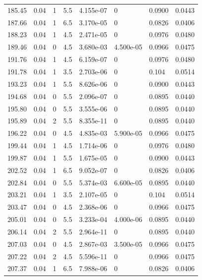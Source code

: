 \documentclass[preview]{standalone}
\begin{document}
{{{{{\begin{tabular}{L{1.2cm}C{1.2cm} C{0.3cm}C{0.5cm} C{1.4cm}C{1.4cm} C{1.4cm}C{1.4cm}}
  185.45  &  0.04  & 1     & 5.5 &  4.155e-07  & 0  & 0.0900 &  0.0443   \\ 
  187.66  &  0.04  & 1     & 6.5 &  3.170e-05  & 0  & 0.0826 &  0.0406   \\ 
  188.23  &  0.04  & 1     & 4.5 &  2.471e-05  & 0  & 0.0976 &  0.0480   \\ 
  189.46  &  0.04  & 0     & 4.5 &  3.680e-03  & 4.500e-05  & 0.0966 &  0.0475   \\ 
  191.76  &  0.04  & 1     & 4.5 &  6.159e-07  & 0  & 0.0976 &  0.0480   \\ 
  191.78  &  0.04  & 1     & 3.5 &  2.703e-06  & 0  & 0.104 &  0.0514   \\ 
  193.23  &  0.04  & 1     & 5.5 &  8.626e-06  & 0  & 0.0900 &  0.0443   \\ 
  194.68  &  0.04  & 0     & 5.5 &  2.096e-07  & 0  & 0.0895 &  0.0440   \\ 
  195.80  &  0.04  & 0     & 5.5 &  3.555e-06  & 0  & 0.0895 &  0.0440   \\ 
  195.89  &  0.04  & 2     & 5.5 &  8.355e-11  & 0  & 0.0895 &  0.0440   \\ 
  196.22  &  0.04  & 0     & 4.5 &  4.835e-03  & 5.900e-05  & 0.0966 &  0.0475   \\ 
  199.44  &  0.04  & 1     & 4.5 &  1.714e-06  & 0  & 0.0976 &  0.0480   \\ 
  199.87  &  0.04  & 1     & 5.5 &  1.675e-05  & 0  & 0.0900 &  0.0443   \\ 
  202.52  &  0.04  & 1     & 6.5 &  9.052e-07  & 0  & 0.0826 &  0.0406   \\ 
  202.84  &  0.04  & 0     & 5.5 &  5.374e-03  & 6.600e-05  & 0.0895 &  0.0440   \\ 
  203.21  &  0.04  & 1     & 3.5 &  2.107e-05  & 0  & 0.104 &  0.0514   \\ 
  203.47  &  0.04  & 0     & 4.5 &  2.368e-06  & 0  & 0.0966 &  0.0475   \\ 
  205.01  &  0.04  & 0     & 5.5 &  3.233e-04  & 4.000e-06  & 0.0895 &  0.0440   \\ 
  206.14  &  0.04  & 2     & 5.5 &  2.964e-11  & 0  & 0.0895 &  0.0440   \\ 
  207.03  &  0.04  & 0     & 4.5 &  2.867e-03  & 3.500e-05  & 0.0966 &  0.0475   \\ 
  207.22  &  0.04  & 2     & 4.5 &  5.596e-11  & 0  & 0.0966 &  0.0475   \\ 
  207.37  &  0.04  & 1     & 6.5 &  7.988e-06  & 0  & 0.0826 &  0.0406   \\ 

\end{tabular}}}}}}
\end{document}
